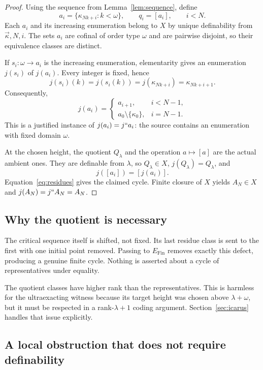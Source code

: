 \documentclass[11pt,letterpaper]{article}
\theoremstyle{definition}
\newcommand{\Fin}{\operatorname{Fin}}
\begin{document}
\begin{proof}
Using the sequence from Lemma~\ref{lem:sequence}, define
\[
 a_i=\{\kappa_{Nk+i}:k<\omega\},\qquad q_i=[a_i],\qquad i<N.
\]
Each $a_i$ and its increasing enumeration belong to $X$ by unique definability from $\vec\kappa,N,i$. The sets $a_i$ are cofinal of order type $\omega$ and are pairwise disjoint, so their equivalence classes are distinct.

If $s_i:\omega\to a_i$ is the increasing enumeration, elementarity gives an enumeration $j(s_i)$ of $j(a_i)$. Every integer is fixed, hence
\[
 j(s_i)(k)=j(s_i(k))=j(\kappa_{Nk+i})=\kappa_{Nk+i+1}.
\]
Consequently,
\begin{equation}\label{eq:residues}
 j(a_i)=
 \begin{cases}
 a_{i+1},&i<N-1,\\
 a_0\setminus\{\kappa_0\},&i=N-1.
 \end{cases}
\end{equation}
This is a justified instance of $j(a_i)=j``a_i$: the source contains an enumeration with fixed domain $\omega$.

At the chosen height, the quotient $Q_\lambda$ and the operation $a\mapsto[a]$ are the actual ambient ones. They are definable from $\lambda$, so $Q_\lambda\in X$, $j(Q_\lambda)=Q_\lambda$, and
\[
 j([a_i])=[j(a_i)].
\]
Equation~\eqref{eq:residues} gives the claimed cycle. Finite closure of $X$ yields $A_N\in X$ and $j(A_N)=j``A_N=A_N$.
\end{proof}

\subsection{Why the quotient is necessary}

The critical sequence itself is shifted, not fixed. Its last residue class is sent to the first with one initial point removed. Passing to $E_{\Fin}$ removes exactly this defect, producing a genuine finite cycle. Nothing is asserted about a cycle of representatives under equality.

The quotient classes have higher rank than the representatives. This is harmless for the ultraexacting witness because its target height was chosen above $\lambda+\omega$, but it must be respected in a rank-$\lambda+1$ coding argument. Section~\ref{sec:icarus} handles that issue explicitly.

\subsection{A local obstruction that does not require definability}
\end{document}
